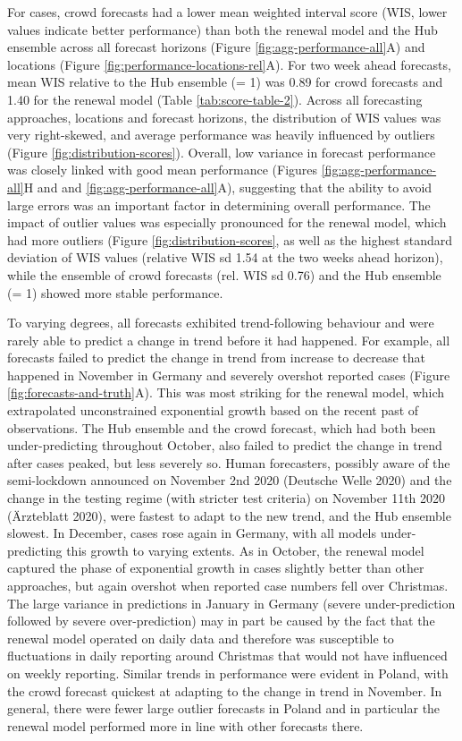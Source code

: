 \documentclass[
]{article}
\begin{document}
For cases, crowd forecasts had a lower mean weighted interval score (WIS, lower values indicate better performance) than both the renewal model and the Hub ensemble across all forecast horizons (Figure \ref{fig:agg-performance-all}A) and locations (Figure \ref{fig:performance-locations-rel}A). For two week ahead forecasts, mean WIS relative to the Hub ensemble (= 1) was 0.89 for crowd forecasts and 1.40 for the renewal model (Table \ref{tab:score-table-2}). Across all forecasting approaches, locations and forecast horizons, the distribution of WIS values was very right-skewed, and average performance was heavily influenced by outliers (Figure \ref{fig:distribution-scores}). Overall, low variance in forecast performance was closely linked with good mean performance (Figures \ref{fig:agg-performance-all}H and and \ref{fig:agg-performance-all}A), suggesting that the ability to avoid large errors was an important factor in determining overall performance. The impact of outlier values was especially pronounced for the renewal model, which had more outliers (Figure \ref{fig:distribution-scores}, as well as the highest standard deviation of WIS values (relative WIS sd 1.54 at the two weeks ahead horizon), while the ensemble of crowd forecasts (rel. WIS sd 0.76) and the Hub ensemble (= 1) showed more stable performance.

To varying degrees, all forecasts exhibited trend-following behaviour and were rarely able to predict a change in trend before it had happened. For example, all forecasts failed to predict the change in trend from increase to decrease that happened in November in Germany and severely overshot reported cases (Figure \ref{fig:forecasts-and-truth}A). This was most striking for the renewal model, which extrapolated unconstrained exponential growth based on the recent past of observations. The Hub ensemble and the crowd forecast, which had both been under-predicting throughout October, also failed to predict the change in trend after cases peaked, but less severely so. Human forecasters, possibly aware of the semi-lockdown announced on November 2nd 2020 (Deutsche Welle 2020) and the change in the testing regime (with stricter test criteria) on November 11th 2020 (Ärzteblatt 2020), were fastest to adapt to the new trend, and the Hub ensemble slowest. In December, cases rose again in Germany, with all models under-predicting this growth to varying extents. As in October, the renewal model captured the phase of exponential growth in cases slightly better than other approaches, but again overshot when reported case numbers fell over Christmas. The large variance in predictions in January in Germany (severe under-prediction followed by severe over-prediction) may in part be caused by the fact that the renewal model operated on daily data and therefore was susceptible to fluctuations in daily reporting around Christmas that would not have influenced on weekly reporting. Similar trends in performance were evident in Poland, with the crowd forecast quickest at adapting to the change in trend in November. In general, there were fewer large outlier forecasts in Poland and in particular the renewal model performed more in line with other forecasts there.
\end{document}
